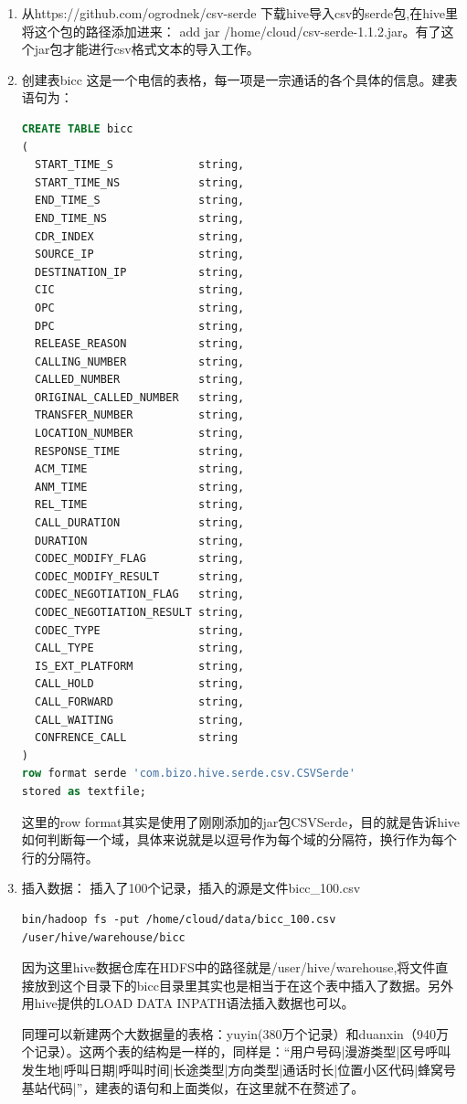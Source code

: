 \begin{enumerate}

\item 从https://github.com/ogrodnek/csv-serde 下载hive导入csv的serde包,在hive里将这个包的路径添加进来： add jar /home/cloud/csv-serde-1.1.2.jar。有了这个jar包才能进行csv格式文本的导入工作。

\item 创建表bicc
这是一个电信的表格，每一项是一宗通话的各个具体的信息。建表语句为：

\begin{lstlisting}[language=SQL]
CREATE TABLE bicc
(
  START_TIME_S             string,
  START_TIME_NS            string,
  END_TIME_S               string,
  END_TIME_NS              string,
  CDR_INDEX                string,
  SOURCE_IP                string,
  DESTINATION_IP           string,
  CIC                      string,
  OPC                      string,
  DPC                      string,
  RELEASE_REASON           string,
  CALLING_NUMBER           string,
  CALLED_NUMBER            string,
  ORIGINAL_CALLED_NUMBER   string,
  TRANSFER_NUMBER          string,
  LOCATION_NUMBER          string,
  RESPONSE_TIME            string,
  ACM_TIME                 string,
  ANM_TIME                 string,
  REL_TIME                 string,
  CALL_DURATION            string,
  DURATION                 string,
  CODEC_MODIFY_FLAG        string,
  CODEC_MODIFY_RESULT      string,
  CODEC_NEGOTIATION_FLAG   string,
  CODEC_NEGOTIATION_RESULT string,
  CODEC_TYPE               string,
  CALL_TYPE                string,
  IS_EXT_PLATFORM          string,
  CALL_HOLD                string,
  CALL_FORWARD             string,
  CALL_WAITING             string,
  CONFRENCE_CALL           string
)
row format serde 'com.bizo.hive.serde.csv.CSVSerde'
stored as textfile;
\end{lstlisting}

这里的row format其实是使用了刚刚添加的jar包CSVSerde，目的就是告诉hive如何判断每一个域，具体来说就是以逗号作为每个域的分隔符，换行作为每个行的分隔符。

\item 插入数据：
插入了100个记录，插入的源是文件bicc\_100.csv
\begin{lstlisting}
bin/hadoop fs -put /home/cloud/data/bicc_100.csv /user/hive/warehouse/bicc
\end{lstlisting}
因为这里hive数据仓库在HDFS中的路径就是/user/hive/warehouse,将文件直接放到这个目录下的bicc目录里其实也是相当于在这个表中插入了数据。另外用hive提供的LOAD DATA INPATH语法插入数据也可以。


  同理可以新建两个大数据量的表格：yuyin(380万个记录）和duanxin（940万个记录）。这两个表的结构是一样的，同样是：“用户号码|漫游类型|区号呼叫发生地|呼叫日期|呼叫时间|长途类型|方向类型|通话时长|位置小区代码|蜂窝号基站代码|”，建表的语句和上面类似，在这里就不在赘述了。
\end{enumerate}

